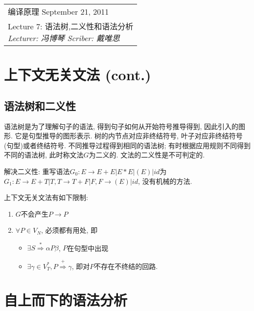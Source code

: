 \def\lecture{7}
\clearpage \noindent\begin{tabularx}{\linewidth}{|X|}
\hline \vskip -2mm
{\sf 编译原理} \hfill September 21, 2011 \\
{\centering \sf \large Lecture \lecture:
语法树,二义性和语法分析 \\ }
\textsl{Lecturer: 冯博琴 \hfill Scriber: 戴唯思}\\ \hline
\end{tabularx}
\setcounter{section}{0}
\renewcommand{\thepage}{\lecture -\arabic{page}}

\section{上下文无关文法 (cont.)}

    \subsection{语法树和二义性}

        \textsf{语法树}是为了理解句子的语法, 得到句子如何从开始符号推导得到, 因此引入的图形. 它是句型推导的图形表示. 树的内节点对应非终结符号, 叶子对应非终结符号(句型)或者终结符号. 不同推导过程得到相同的语法树; 有时根据应用规则不同得到不同的语法树, 此时称文法$G$为\textsf{二义的}. 文法的二义性是不可判定的.

        解决二义性: 重写语法$G_0:E\to E+E|E*E|(E)|id$为$G_1:E\to E+T|T, T\to T+F|F, F\to(E)|id$, 没有机械的方法.

        上下文无关文法有如下限制:

        \begin{enumerate}
            \item $G$不会产生$P\to P$
            \item $\forall P\in V_N$, 必须都有用处, 即
                \begin{itemize}
                    \item $\exists S\stackrel{*}{\Rightarrow} \alpha P\beta$, $P$在句型中出现
                    \item $\exists \gamma\in V_T^*, P\stackrel{+}{\Rightarrow}\gamma$, 即对$P$不存在不终结的回路.
                \end{itemize}
        \end{enumerate}

\section{自上而下的语法分析}

